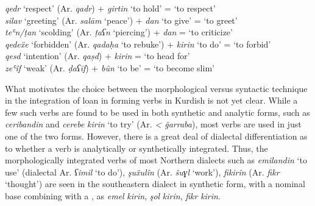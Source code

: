 \documentclass[output=paper]{langsci/langscibook}
\begin{document}
\ea\label{compound}
\textit{qedr} ‘respect’              (Ar. \textit{qadr})                +   \textit{girtin} ‘to hold’    =  ‘to respect’     \\
\textit{silav} ‘greeting’            (Ar. \textit{salām} ‘peace’)       +   \textit{dan} ‘to give’       =   ‘to greet’      \\
\textit{teʿn\slash ṭan} ‘scolding’   (Ar. \textit{ṭaʕn} ‘piercing’)     + \textit{dan}                   =   ‘to criticize’  \\
\textit{qedeẍe} ‘forbidden’          (Ar. \textit{qadaḥa} ‘to rebuke’)  +   \textit{kirin} ‘to do’       =   ‘to forbid’     \\
\textit{qesd} ‘intention’            (Ar. \textit{qaṣd})                +   \textit{kirin}               =   ‘to head for’   \\
\textit{zeʿîf} ‘weak’                (Ar. \textit{ḍaʕīf})               +   \textit{bûn} ‘to be’         =   ‘to become slim’
\z

What motivates the choice between the morphological versus syntactic technique in the integration of  loan  in forming verbs in Kurdish is not yet clear. While a few such verbs are found to be used in both synthetic and analytic forms, such as \textit{ceribandin} and \textit{cerebe} \textit{kirin} ‘to try’ (Ar. \textit{< ǧarraba}), most verbs are used in just one of the two forms. However, there is a great deal of dialectal differentiation as to whether a verb is analytically or synthetically integrated. Thus, the morphologically integrated verbs of most {Northern}  dialects such as \textit{emilandin} ‘to use’ (dialectal Ar. \textit{ʕimil} ‘to do’), \textit{şuẍulîn} (Ar. \textit{šuɣl} ‘work’), \textit{fikirîn} (Ar. \textit{fikr} ‘thought’) are seen in the southeastern  dialect in synthetic form, with a nominal base combining with a , as \textit{emel} \textit{kirin}, \textit{şol} \textit{kirin}, \textit{fikr} \textit{kirin}.   
\end{document}
